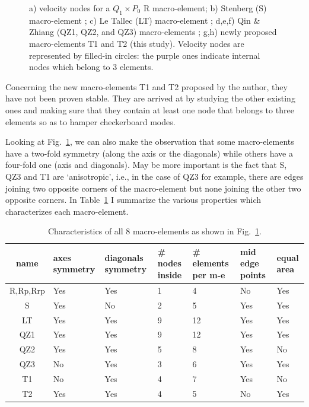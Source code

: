 \documentclass[a4paper,12pt]{article}
\begin{document}
\begin{figure}[t]
\centering

\caption{
a) velocity nodes for a $Q_1\times P_0$ R macro-element;
b) Stenberg (S) macro-element \cite{sten84}; 
c) Le Tallec (LT) macro-element \cite{leta81,leru86}; 
d,e,f) Qin \& Zhiang (QZ1, QZ2, and QZ3) macro-elements \cite{qizh07}; 
g,h) newly proposed macro-elements T1 and T2 (this study).
Velocity nodes are represented by filled-in circles: 
the purple ones indicate internal nodes which belong to 3 elements.
\label{fig:mes}}
\end{figure}

Concerning the new macro-elements T1 and T2 proposed by the author, they have not been proven stable. 
They are arrived at by studying the other existing ones and making sure that they contain at 
least one node that belongs to three elements so as to hamper checkerboard modes.


Looking  at Fig.~\ref{fig:mes}, we can also make the observation that some macro-elements 
have a two-fold symmetry (along the axis or the diagonals) while others have a four-fold one 
(axis and diagonals). May be more important is the fact that S, QZ3 and T1 are `anisotropic', i.e., in 
the case of QZ3 for example, there are edges joining two opposite corners of the macro-element
but none joining the other two opposite corners.
In Table~\ref{tab1} I summarize the various properties which characterizes each macro-element.

\begin{table}
\centering
\begin{tabular}{cp{2cm}p{2cm}p{2.5cm}p{2cm}p{2cm}p{2cm}}
\hline
{name} & {axes symmetry}  & {diagonals symmetry} & {\# nodes inside} 
& {\# elements per m-e} & {mid edge points} & equal area \\
\hline
\hline
R,Rp,Rrp   &  Yes &  Yes & 1  & 4 & No  & Yes\\
S   &  Yes &   No & 2  & 5 & Yes & Yes\\
LT  &  Yes &  Yes & 9 & 12 & Yes & Yes\\
QZ1 &  Yes &  Yes & 9 & 12 & Yes & Yes\\
QZ2 &  Yes &  Yes & 5 & 8  & Yes & No\\
QZ3 &  No  &  Yes & 3 & 6  & Yes & Yes\\
T1  &  No  &  Yes & 4 & 7  & Yes & No\\
T2  &  Yes &  Yes & 4 & 5  & No  & Yes\\
\hline
\end{tabular}
\caption{Characteristics of all 8 macro-elements as shown in Fig.~\ref{fig:mes}.\label{tab1}}%
\end{table}
\end{document}
